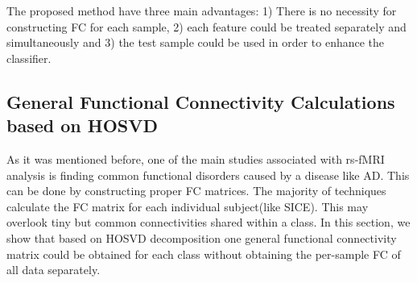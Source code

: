\documentclass[journal]{IEEEtran}
\begin{document}
	The proposed method have three main advantages: 1) There is no necessity for constructing FC for each sample, 2) each feature could be treated separately and simultaneously and 3) the test sample could be used in order to enhance the classifier. 
	
	
%	
%	

	\subsection{General Functional Connectivity Calculations based on HOSVD} \label{FC_Construction}
	
	
	As it was mentioned before, one of the main studies associated with rs-fMRI analysis is finding common functional disorders caused by a disease like AD. This can be done by constructing proper FC matrices. The majority of techniques calculate the FC matrix for each individual subject(like SICE). This may overlook tiny but common connectivities shared within a class. 
	In this section, we show that based on HOSVD decomposition one general functional connectivity matrix could be obtained for each class without obtaining the per-sample FC of all data separately. 
	
\end{document}
